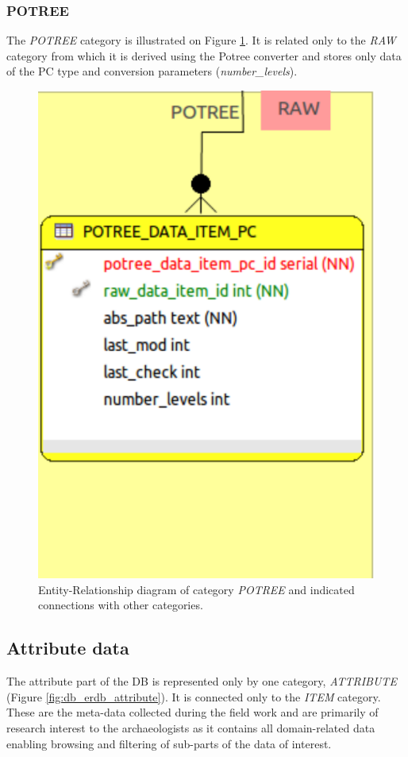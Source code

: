 \subsubsection{POTREE}
The {\em POTREE} category is illustrated on Figure \ref{fig:db_erdb_potree}. It
is related only to the {\em RAW} category from which it is derived using the Potree
converter and stores only data of the PC type and conversion parameters ({\em number\_levels}).

\begin{figure}[!H]
\centering
\includegraphics[scale=0.35]{fig/database/ERDB_POTREE_conn.pdf}
\caption{Entity-Relationship diagram of category {\em POTREE} and indicated
connections with other categories.}
\label{fig:db_erdb_potree}
\end{figure}

\subsection{Attribute data}
The attribute part of the DB is represented only by one category, {\em ATTRIBUTE}
(Figure \ref{fig:db_erdb_attribute}). It is connected only to the {\em ITEM} category.
These are the meta-data collected during the field work and are primarily of research
interest to the archaeologists as it contains all domain-related data enabling browsing
and filtering of sub-parts of the data of interest.

